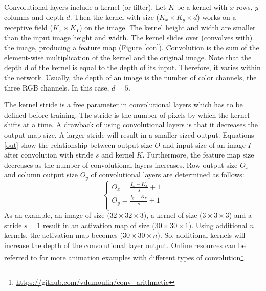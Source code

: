     Convolutional layers include a kernel (or filter). Let $K$ be a kernel with $x$ rows, $y$ columns and depth $d$. Then the kernel with size ($K_x \times K_y \times d$) works on a receptive field ($K_x \times K_Y$) on the image. The kernel height and width are smaller than the input image height and width. The kernel slides over (convolves with) the image, producing a feature map (Figure \ref{con}). Convolution is the sum of the element-wise multiplication of the kernel and the original image. Note that the depth d of the kernel is equal to the depth of its input. Therefore, it varies within the network. Usually, the depth of an image is the number of color channels, the three RGB channels. In this case, $d=5$. 

    The kernel stride is a free parameter in convolutional layers which has to be defined before training. The stride is the number of pixels by which the kernel shifts at a time. A drawback of using convolutional layers is that it decreases the output map size. A larger stride will result in a smaller sized output. Equations \ref{out} show the relationship between output size $O$ and input size of an image $I$ after convolution with stride $s$ and kernel $K$. Furthermore, the feature map size decreases as the number of convolutional layers increases. Row output size $O_x$ and column output size $O_y$ of convolutional layers are determined as follows:
    \begin{equation}
        \begin{cases}
            O_x = \frac{I_x-K_x}{s} + 1 \\
            O_y = \frac{I_y - K_Y}{s} + 1 \\
        \end{cases}
        \label{out}
    \end{equation}
    As an example, an image of size ($32\times 32 \times 3$), a kernel of size ($3\times 3\times 3$) and a stride $s=1$ result in an activation map of size ($30 \times 30 \times 1$). Using additional $n$ kernels, the activation map becomes ($30\times30\times n$). So, additional kernels will increase the depth of the convolutional layer output. Online resources can be referred to for more animation examples with different types of convolution\footnote{\url{https://github.com/vdumoulin/conv_arithmetic}}.

